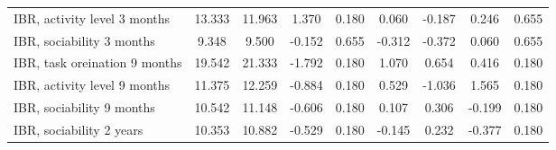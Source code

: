 \begin{tabular}{l c c c r c c c r}
IBR, activity level 3 months & 13.333 & 11.963 & 1.370 & 0.180 & 0.060 & -0.187 & 0.246 & 0.655 \\
IBR, sociability 3 months & 9.348 & 9.500 & -0.152 & 0.655 & -0.312 & -0.372 & 0.060 & 0.655 \\
IBR, task oreination 9 months & 19.542 & 21.333 & -1.792 & 0.180 & 1.070 & 0.654 & 0.416 & 0.180 \\
IBR, activity level 9 months & 11.375 & 12.259 & -0.884 & 0.180 & 0.529 & -1.036 & 1.565 & 0.180 \\
IBR, sociability 9 months & 10.542 & 11.148 & -0.606 & 0.180 & 0.107 & 0.306 & -0.199 & 0.180 \\
IBR, sociability 2 years & 10.353 & 10.882 & -0.529 & 0.180 & -0.145 & 0.232 & -0.377 & 0.180 \\
\bottomrule
\end{tabular}
